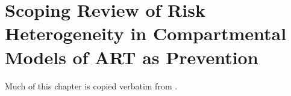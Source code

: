 \chapter{Scoping Review of Risk Heterogeneity in Compartmental Models of ART as Prevention}\label{sr}
Much of this chapter is copied verbatim from \cite{Knight2022sr}.




\printchapterbibliography
